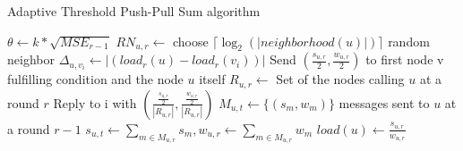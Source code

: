 \begin{algorithm}
    \caption{Adaptive Threshold Push-Pull Sum algorithm}\label{alg:PPS}
    \begin{algorithmic}[1]
    \State $\theta \leftarrow k * \sqrt{MSE_{r-1}}$ 
    \EndProcedure
    \State $RN_{u,r} \leftarrow$ choose $\lceil \log_{2}{(|neighborhood(u)|)} \rceil$ random neighbor
    \State $\Delta_{u, v_{i}} \leftarrow |(load_r(u) - load_r(v_{i}))|$
    \State Send $(\frac{s_{u,r}}{2}, \frac{w_{u,r}}{2})$ to first node v fulfilling condition and the node $u$ itself
    \EndIf
    \EndFor
    \EndProcedure
    \State $R_{u,r} \leftarrow$ Set of the nodes calling $u$ at a round $r$
    \State Reply to i with $\left( \frac{\frac{s_{u,r}}{2}}{|R_{u,r}|}, \frac{\frac{w_{u,r}}{2}}{|R_{u,r}|} \right)$
    \EndFor
    \EndProcedure
    \State $M_{u,t} \leftarrow \{(s_{m}, w_{m})\}$ messages sent to $u$ at a round $r-1$
    \State $s_{u,t} \leftarrow \sum_{m \in M_{u,r}}^{}s_{m}, w_{u,r} \leftarrow\sum_{m \in M_{u,r}}^{}w_{m}$
    \State $load(u) \leftarrow \frac{s_{u,r}}{w_{u,r}}$
    \EndProcedure
    \end{algorithmic}
    \end{algorithm}